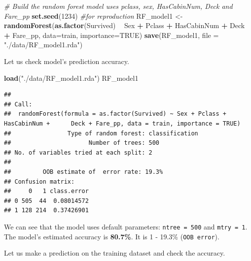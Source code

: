\documentclass[
]{book}
\newenvironment{Shaded}{\begin{snugshade}}{\end{snugshade}}
\newcommand{\CommentTok}[1]{\textcolor[rgb]{0.56,0.35,0.01}{\textit{#1}}}
\newcommand{\DataTypeTok}[1]{\textcolor[rgb]{0.13,0.29,0.53}{#1}}
\newcommand{\DecValTok}[1]{\textcolor[rgb]{0.00,0.00,0.81}{#1}}
\newcommand{\KeywordTok}[1]{\textcolor[rgb]{0.13,0.29,0.53}{\textbf{#1}}}
\newcommand{\NormalTok}[1]{#1}
\newcommand{\OperatorTok}[1]{\textcolor[rgb]{0.81,0.36,0.00}{\textbf{#1}}}
\newcommand{\OtherTok}[1]{\textcolor[rgb]{0.56,0.35,0.01}{#1}}
\newcommand{\StringTok}[1]{\textcolor[rgb]{0.31,0.60,0.02}{#1}}
\begin{document}
\begin{Shaded}
\begin{Highlighting}[]
\CommentTok{# Build the random forest model uses pclass, sex, HasCabinNum, Deck and Fare_pp}
\KeywordTok{set.seed}\NormalTok{(}\DecValTok{1234}\NormalTok{) }\CommentTok{#for reproduction }
\NormalTok{ RF_model1 <-}\StringTok{ }\KeywordTok{randomForest}\NormalTok{(}\KeywordTok{as.factor}\NormalTok{(Survived) }\OperatorTok{~}\StringTok{ }\NormalTok{Sex }\OperatorTok{+}\StringTok{ }\NormalTok{Pclass }\OperatorTok{+}\StringTok{ }\NormalTok{HasCabinNum }\OperatorTok{+}\StringTok{ }\NormalTok{Deck }\OperatorTok{+}\StringTok{ }\NormalTok{Fare_pp, }\DataTypeTok{data=}\NormalTok{train, }\DataTypeTok{importance=}\OtherTok{TRUE}\NormalTok{)}
 \KeywordTok{save}\NormalTok{(RF_model1, }\DataTypeTok{file =} \StringTok{"./data/RF_model1.rda"}\NormalTok{)}
\end{Highlighting}
\end{Shaded}

Let us check model's prediction accuracy.

\begin{Shaded}
\begin{Highlighting}[]
\KeywordTok{load}\NormalTok{(}\StringTok{"./data/RF_model1.rda"}\NormalTok{)}
\NormalTok{RF_model1}
\end{Highlighting}
\end{Shaded}

\begin{verbatim}
## 
## Call:
##  randomForest(formula = as.factor(Survived) ~ Sex + Pclass + HasCabinNum +      Deck + Fare_pp, data = train, importance = TRUE) 
##                Type of random forest: classification
##                      Number of trees: 500
## No. of variables tried at each split: 2
## 
##         OOB estimate of  error rate: 19.3%
## Confusion matrix:
##     0   1 class.error
## 0 505  44  0.08014572
## 1 128 214  0.37426901
\end{verbatim}

We can see that the model uses default parameters: \texttt{ntree\ =\ 500} and \texttt{mtry\ =\ 1}. The model's estimated accuracy is \textbf{80.7\%}. It is 1 - 19.3\% (\texttt{OOB\ error}).

Let us make a prediction on the training dataset and check the accuracy.

\begin{Shaded}
\end{Shaded}
\end{document}
